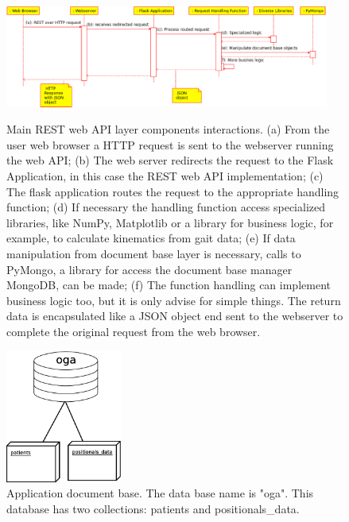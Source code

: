 \documentclass[journal]{IEEEtran}
\begin{document}
\begin{figure}[tb]
	\centering
	{\includegraphics[width=0.95\textwidth]{img/rest_web_api_components.eps}}
	\caption{Main REST web API layer components interactions.
		(a) From the user web browser a HTTP request is sent to the  webserver running the web API;
		(b) The web server redirects the request to the Flask Application, in this case the REST 
		web API implementation;
		(c) The flask application routes the request to the appropriate handling function;
		(d) If necessary the handling function access specialized libraries, like NumPy,
		Matplotlib or a library for business logic, for example,
		to calculate kinematics from gait data;
		(e) If data manipulation from document base layer is necessary, calls to PyMongo, a library for
		access the document base manager MongoDB, can be made;
		(f) The function handling can implement business logic too, but it is only advise for simple
		things. The return data is encapsulated like a JSON object end sent to the webserver to
		complete the original request from the web browser.
	}
	\label{rest_web_api_components}
\end{figure}
\begin{figure}[!t]
	\centering
	\includegraphics[width=1.5in]{img/mongo_oga.eps}
	\caption{Application document base. The data base name is "oga". 
	This database has two collections: patients and positionals\_data. 
	}
	\label{mongo_oga}
\end{figure}
\end{document}
